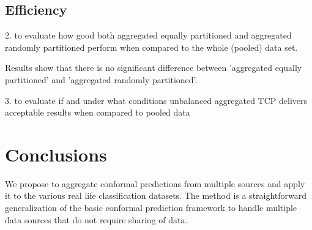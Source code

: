 \documentclass[main]{subfiles}
\begin{document}
\subsection{Efficiency}
2. to evaluate how good both aggregated equally partitioned and aggregated randomly partitioned perform when compared to the whole (pooled) data set.

Results show that there is no significant difference between 'aggregated equally partitioned' and 'aggregated randomly partitioned'.

3. to evaluate if and under what conditions unbalanced aggregated TCP delivers acceptable results when compared to pooled data




\section{Conclusions}
We propose to aggregate conformal predictions from multiple sources and apply it to the various real life classification datasets. The  method  is  a  straightforward
generalization of the basic conformal prediction framework to handle multiple data sources that do not require sharing of data. %
\end{document}
